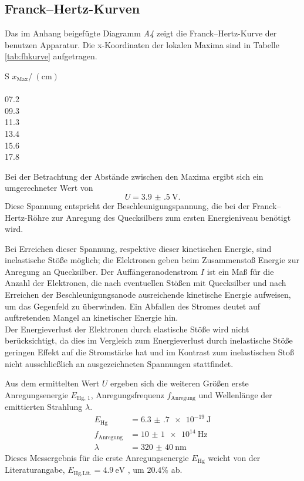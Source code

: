 \subsection{Franck--Hertz-Kurven} %
\label{sec:fhk}
Das im Anhang beigefügte Diagramm \emph{A4} zeigt die Franck--Hertz-Kurve der benutzen Apparatur.
Die x-Koordinaten der lokalen Maxima sind in Tabelle \ref{tab:fhkurve} aufgetragen.
\begin{table}
	\centering
		\begin{tabular}{S}
		\toprule
		{$x_\text{Max}$/$\:(\si{\centi\meter})$}\\
		\\
			07.2\\
			09.3\\
			11.3\\
			13.4\\
			15.6\\
			17.8
		\end{tabular}
	\caption{x-Koordinaten der Maxima der Franck--Hertz-Kurve, ausgelesen aus Appendix \emph{A4}.}
	\label{tab:fhkurve}
\end{table}
Bei der Betrachtung der Abstände zwischen den Maxima ergibt sich ein umgerechneter Wert von
\begin{equation}
	U=\SI{3.9(5)}{\volt}.
\end{equation}
Diese Spannung entspricht der Beschleunigungspannung, die bei der Franck--Hertz-Röhre zur Anregung des Quecksilbers zum ersten Energieniveau benötigt wird.

Bei Erreichen dieser Spannung, respektive dieser kinetischen Energie, sind inelastische Stöße möglich; die Elektronen geben beim Zusammenstoß Energie zur Anregung an Quecksilber.
Der Auffängeranodenstrom $I$ ist ein Maß für die Anzahl der Elektronen, die nach eventuellen Stößen mit Quecksilber und nach Erreichen der Beschleunigungsanode ausreichende kinetische Energie aufweisen, um das Gegenfeld zu überwinden.
Ein Abfallen des Stromes deutet auf auftretenden Mangel an kinetischer Energie hin.\\
Der Energieverlust der Elektronen durch elastische Stöße wird nicht berücksichtigt, da dies im Vergleich zum Energieverlust durch inelastische Stöße geringen Effekt auf die Stromstärke hat und im Kontrast zum inelastischen Stoß nicht ausschließlich an ausgezeichneten Spannungen stattfindet.

Aus dem ermittelten Wert $U$ ergeben sich die weiteren Größen erste Anregungsenergie $E_\text{Hg, 1}$, Anregungsfrequenz $f_\text{Anregung}$ und Wellenlänge der emittierten Strahlung $\lambda$.
\begin{align}	
	E_\text{Hg}		&=\SI{6.3(7)e-19}{\joule}\\
	f_\text{Anregung}	&=\SI{10(1)e+14}{\hertz}\\
	\lambda				&=\SI{320(40)}{\nano\meter}
\end{align}
Dieses Messergebnis für die erste Anregungsenergie $E_\text{Hg}$ weicht von der Literaturangabe, $E_\text{Hg,Lit.}=\SI{4.9}{\electronvolt}$ \cite{IonEx}, um $20.4\%$ ab.

